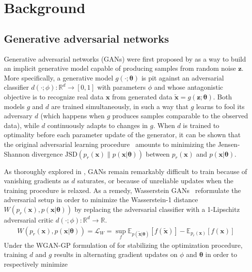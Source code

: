 \documentclass[twocolumn,superscriptaddress,aps]{revtex4-1}
\newcommand{\bftheta}{{\bm \theta}}
\newcommand{\bfz}{\mathbf{z}}
\theoremstyle{plain}
\begin{document}
\section{Background}

\subsection{Generative adversarial networks}
\label{sec:gans}

Generative adversarial networks (GANs) were first proposed by
\cite{goodfellow2014generative} as a way to build an implicit generative model
capable of producing samples from random noise $\bfz$. More specifically,
a generative model $g(\cdot; \bftheta)$ is pit against an adversarial
classifier $d(\cdot; \phi):\mathbb{R}^d \to [0,1]$ with parameters $\phi$ and whose antagonistic objective is to recognize real data $\mathbf{x}$
from generated data $\tilde{\mathbf{x}} = g(\bfz; \bftheta)$. Both models $g$ and $d$
are trained simultaneously, in such a way that $g$ learns to fool
its adversary $d$ (which happens when $g$ produces samples comparable to the
observed data), while $d$ continuously adapts to changes in $g$. When $d$ is
trained to optimality before each parameter update of the generator, it can
be shown that the original adversarial learning procedure~\cite{goodfellow2014generative} amounts to minimizing
the Jensen-Shannon divergence $\text{JSD}(p_r(\mathbf{x}) \parallel p(\mathbf{x}|\bftheta))$ between $p_r(\mathbf{x})$ and $p(\mathbf{x}|\bftheta)$.

As thoroughly explored in \citep{2017arXiv170104862A}, GANs remain remarkably
difficult to train because of vanishing gradients as $d$ saturates, or because of
unreliable updates when the training procedure is relaxed. As a remedy,
Wasserstein GANs~\citep{2017arXiv170107875A} reformulate the adversarial
setup in order to minimize the Wasserstein-1 distance $W(p_r(\mathbf{x}), p(\mathbf{x}|\bftheta))$ by
replacing the adversarial classifier with a 1-Lipschitz adversarial critic
$d(\cdot; \phi) : \mathbb{R}^d \to \mathbb{R}$. 
\begin{align}
   W( p_r(\mathbf{x} ), p(\mathbf{x} | \bftheta)  ) = \mathcal{L}_W = \sup_{f} \mathbb{E}_{p(\tilde{\mathbf{x}}|\bftheta)} [f(\tilde{\mathbf{x}})] - \mathbb{E}_{p_r(\mathbf{x})} [f(\mathbf{x})]
\end{align}
Under the WGAN-GP formulation of \cite{2017arXiv170400028G}
for stabilizing the optimization procedure,
training $d$ and $g$ results in alternating gradient updates on $\phi$ and $\bftheta$ in order to respectively minimize
\end{document}
